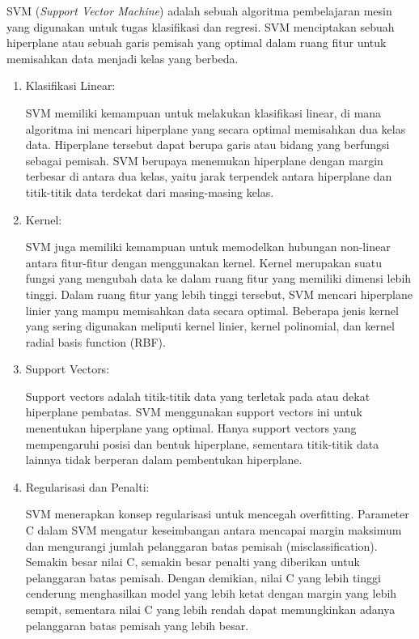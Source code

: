 SVM (\emph{Support Vector Machine}) adalah sebuah algoritma pembelajaran mesin yang
digunakan untuk tugas klasifikasi dan regresi. SVM menciptakan sebuah
hiperplane atau sebuah garis pemisah yang optimal dalam ruang fitur untuk
memisahkan data menjadi kelas yang berbeda. \parencite{28}

\begin{enumerate}[nolistsep]
  \item Klasifikasi Linear:

        SVM memiliki kemampuan untuk melakukan klasifikasi linear, di mana
        algoritma ini mencari hiperplane yang secara optimal memisahkan dua kelas
        data. Hiperplane tersebut dapat berupa garis atau bidang yang berfungsi
        sebagai pemisah. SVM berupaya menemukan hiperplane dengan margin terbesar
        di antara dua kelas, yaitu jarak terpendek antara hiperplane dan titik-titik
        data terdekat dari masing-masing kelas.

  \item Kernel:

        SVM juga memiliki kemampuan untuk memodelkan hubungan non-linear antara
        fitur-fitur dengan menggunakan kernel. Kernel merupakan suatu fungsi
        yang mengubah data ke dalam ruang fitur yang memiliki dimensi lebih
        tinggi. Dalam ruang fitur yang lebih tinggi tersebut, SVM mencari
        hiperplane linier yang mampu memisahkan data secara optimal. Beberapa
        jenis kernel yang sering digunakan meliputi kernel linier, kernel
        polinomial, dan kernel radial basis function (RBF).

  \item Support Vectors:

        Support vectors adalah titik-titik data yang terletak pada atau dekat
        hiperplane pembatas. SVM menggunakan support vectors ini untuk
        menentukan hiperplane yang optimal. Hanya support vectors yang
        mempengaruhi posisi dan bentuk hiperplane, sementara titik-titik data
        lainnya tidak berperan dalam pembentukan hiperplane.

  \item Regularisasi dan Penalti:

        SVM menerapkan konsep regularisasi untuk mencegah overfitting.
        Parameter C dalam SVM mengatur keseimbangan antara mencapai margin
        maksimum dan mengurangi jumlah pelanggaran batas pemisah
        (misclassification). Semakin besar nilai C, semakin besar penalti
        yang diberikan untuk pelanggaran batas pemisah. Dengan demikian,
        nilai C yang lebih tinggi cenderung menghasilkan model yang lebih
        ketat dengan margin yang lebih sempit, sementara nilai C yang lebih
        rendah dapat memungkinkan adanya pelanggaran batas pemisah yang lebih
        besar.


\end{enumerate}
